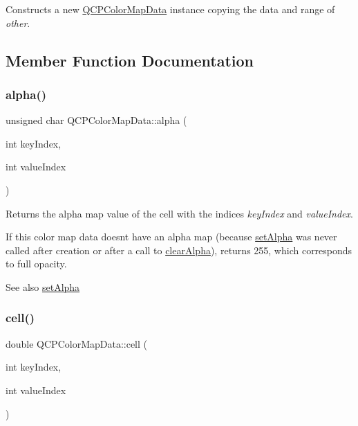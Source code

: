 Constructs a new \mbox{\hyperlink{class_q_c_p_color_map_data}{Q\+C\+P\+Color\+Map\+Data}} instance copying the data and range of {\itshape other}. 

\subsection{Member Function Documentation}
\mbox{\label{class_q_c_p_color_map_data_a4f7e6b7a97017400cbbd46f0660e68ea}} 
\subsubsection{\texorpdfstring{alpha()}{alpha()}}
{\footnotesize\ttfamily unsigned char Q\+C\+P\+Color\+Map\+Data\+::alpha (\begin{DoxyParamCaption}\item[{int}]{key\+Index,  }\item[{int}]{value\+Index }\end{DoxyParamCaption})}

Returns the alpha map value of the cell with the indices {\itshape key\+Index} and {\itshape value\+Index}.

If this color map data doesn\textquotesingle{}t have an alpha map (because \mbox{\hyperlink{class_q_c_p_color_map_data_aaf7de5b34c58f38d8f4c1ceb064a876c}{set\+Alpha}} was never called after creation or after a call to \mbox{\hyperlink{class_q_c_p_color_map_data_a14d08b9c3720cd719400079b86d3906b}{clear\+Alpha}}), returns 255, which corresponds to full opacity.

\begin{DoxySeeAlso}{See also}
\mbox{\hyperlink{class_q_c_p_color_map_data_aaf7de5b34c58f38d8f4c1ceb064a876c}{set\+Alpha}} 
\end{DoxySeeAlso}
\mbox{\label{class_q_c_p_color_map_data_af51ecd21f347adbf87b4cce4e1f5cbd6}} 
\subsubsection{\texorpdfstring{cell()}{cell()}}
{\footnotesize\ttfamily double Q\+C\+P\+Color\+Map\+Data\+::cell (\begin{DoxyParamCaption}\item[{int}]{key\+Index,  }\item[{int}]{value\+Index }\end{DoxyParamCaption})}

